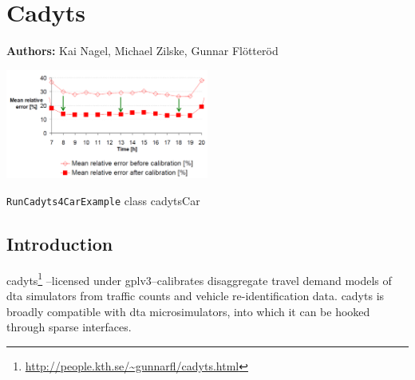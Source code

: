 \chapter{Cadyts}
\label{ch:cadyts}

\hfill \textbf{Authors:} Kai Nagel, Michael Zilske, Gunnar Fl\"otter\"od

\begin{center} \includegraphics[width=0.5\textwidth, angle=0]{extending/figures/cadyts/cadyts} \end{center}


{\lstinline{RunCadyts4CarExample} class}
{cadytsCar}
{\citet[][]{cadyts-manual, floetteroed-2010e, FloetteroedChenEtAl2011BehavioralCalibAndAnaNETS, Floetteroed2008PhD, Moyo2013PhD}}



\section{Introduction}

\gls{cadyts}\footnote{\url{http://people.kth.se/~gunnarfl/cadyts.html}}
--licensed under \gls{gplv3}--calibrates disaggregate travel demand models 
of \gls{dta} simulators from traffic counts and vehicle re-identification data. 
\gls{cadyts} is broadly compatible with \gls{dta} microsimulators,
into which it can be hooked through sparse interfaces.


